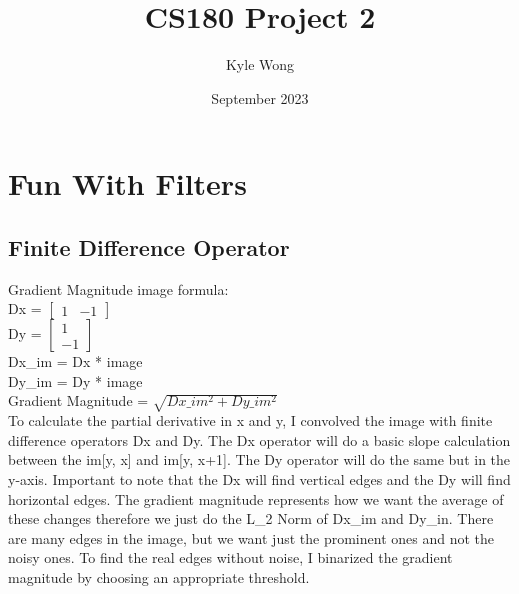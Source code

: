 \documentclass{article}
\title{CS180 Project 2}
\author{Kyle Wong}
\date{September 2023}
\begin{document}
\maketitle

\section{Fun With Filters}
\subsection{Finite Difference Operator}
Gradient Magnitude image formula:\\
Dx = 
$\begin{bmatrix}
1 & -1
\end{bmatrix}$
\\
Dy = 
$\begin{bmatrix}
1\\
-1
\end{bmatrix}$\\
Dx\_im = Dx * image\\
Dy\_im = Dy * image\\
Gradient Magnitude = $\sqrt{Dx\_im ^2 + Dy\_im ^2}$\\

To calculate the partial derivative in x and y, I convolved the image with finite difference operators Dx and Dy. The Dx operator will do a basic slope calculation between the im[y, x] and im[y, x+1]. The Dy operator will do the same but in the y-axis. Important to note that the Dx will find vertical edges and the Dy will find horizontal edges. The gradient magnitude represents how we want the average of these changes therefore we just do the L\_2 Norm of Dx\_im and Dy\_in. There are many edges in the image, but we want just the prominent ones and not the noisy ones. To find the real edges without noise, I binarized the gradient magnitude by choosing an appropriate threshold.
\end{document}
